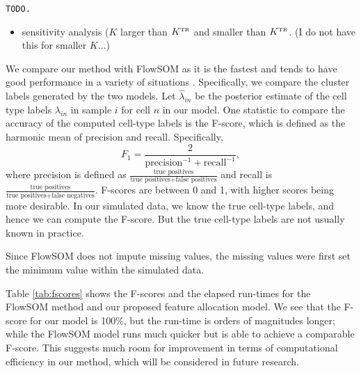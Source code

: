 \documentclass[12pt,]{article}
\newcommand{\true}{{\mbox{\tiny TR}}}
\begin{document}
{\tt TODO.
\begin{itemize}



\item sensitivity analysis ($K$ larger than $K^\true$ and smaller than
  $K^\true$. (I do not have this for smaller $K$...)

\end{itemize}
}

We compare our method with FlowSOM as it is the fastest and tends to have good
performance in a variety of situations \citep{weber2016comparison}.
Specifically, we compare the cluster labels generated by the two models.
Let $\hat \lambda_{in}$ be the posterior estimate of the cell type labels
$\lambda_{in}$ in sample $i$ for cell $n$ in our model. 
One statistic to compare the accuracy of the computed cell-type labels is
the F-score, which is defined as the harmonic mean of precision and recall.
Specifically,
$$
F_1 = \frac{2}{\text{precision}^{-1} + \text{recall}^{-1}},
$$
where precision is defined as $\frac{\text{true positives}}{\text{true
positives} + \text{false positives}}$ and recall is $\frac{\text{true
positives}}{\text{true positives} + \text{false negatives}}$.  F-scores are
between 0 and 1, with higher scores being more desirable. In our simulated
data, we know the true cell-type labels, and hence we can compute the F-score.
But the true cell-type labels are not usually known in practice.

Since FlowSOM does not impute missing values, the missing values were
first set the minimum value within the simulated data.

Table \ref{tab:fscores} shows the F-scores and the elapsed run-times 
for the FlowSOM method and our proposed feature allocation model.
We see that the F-score for our model is 100\%, but the run-time is 
orders of magnitudes longer; while the FlowSOM model runs much quicker
but is able to achieve a comparable F-score. This suggests much
room for improvement in terms of computational efficiency in 
our method, which will be considered in future research.
\end{document}
